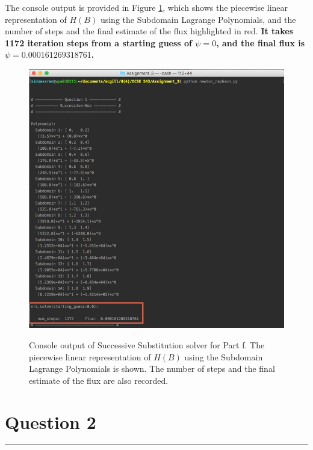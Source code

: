 \documentclass[11pt]{article}
\begin{document}
The console output is provided in Figure \ref{fig:SS_Q1}, which shows the piecewise linear representation of $H(B)$ using the Subdomain Lagrange Polynomials, and the number of steps and the final estimate of the flux highlighted in red. \textbf{It takes 1172 iteration steps from a starting guess of $\psi=0$, and the final flux is $\psi=0.000161269318761$.}
\begin{figure}[!hbp]
	\begin{center}
		\begin{minipage}{ \textwidth}
			\includegraphics[width= \textwidth]{SS_Q1.png}\\
			\caption{\label{fig:SS_Q1}Console output of Successive Substitution solver for Part f. The piecewise linear representation of $H(B)$ using the Subdomain Lagrange Polynomials is shown. The number of steps and the final estimate of the flux are also recorded.}
		\end{minipage}
	\end{center}
\end{figure}

\section*{Question 2}
\vspace*{-0.1in}
\noindent\rule{\textwidth}{0.4pt}
\end{document}
